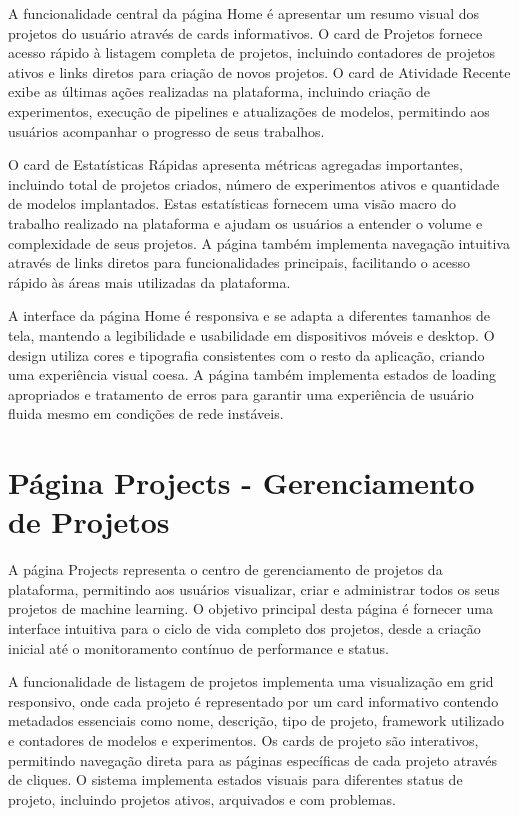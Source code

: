 \documentclass[12pt,a4paper]{article}
\begin{document}
A funcionalidade central da página Home é apresentar um resumo visual dos projetos do usuário através de cards informativos. O card de Projetos fornece acesso rápido à listagem completa de projetos, incluindo contadores de projetos ativos e links diretos para criação de novos projetos. O card de Atividade Recente exibe as últimas ações realizadas na plataforma, incluindo criação de experimentos, execução de pipelines e atualizações de modelos, permitindo aos usuários acompanhar o progresso de seus trabalhos.

O card de Estatísticas Rápidas apresenta métricas agregadas importantes, incluindo total de projetos criados, número de experimentos ativos e quantidade de modelos implantados. Estas estatísticas fornecem uma visão macro do trabalho realizado na plataforma e ajudam os usuários a entender o volume e complexidade de seus projetos. A página também implementa navegação intuitiva através de links diretos para funcionalidades principais, facilitando o acesso rápido às áreas mais utilizadas da plataforma.

A interface da página Home é responsiva e se adapta a diferentes tamanhos de tela, mantendo a legibilidade e usabilidade em dispositivos móveis e desktop. O design utiliza cores e tipografia consistentes com o resto da aplicação, criando uma experiência visual coesa. A página também implementa estados de loading apropriados e tratamento de erros para garantir uma experiência de usuário fluida mesmo em condições de rede instáveis.

\section{Página Projects - Gerenciamento de Projetos}

A página Projects representa o centro de gerenciamento de projetos da plataforma, permitindo aos usuários visualizar, criar e administrar todos os seus projetos de machine learning. O objetivo principal desta página é fornecer uma interface intuitiva para o ciclo de vida completo dos projetos, desde a criação inicial até o monitoramento contínuo de performance e status.

A funcionalidade de listagem de projetos implementa uma visualização em grid responsivo, onde cada projeto é representado por um card informativo contendo metadados essenciais como nome, descrição, tipo de projeto, framework utilizado e contadores de modelos e experimentos. Os cards de projeto são interativos, permitindo navegação direta para as páginas específicas de cada projeto através de cliques. O sistema implementa estados visuais para diferentes status de projeto, incluindo projetos ativos, arquivados e com problemas.
\end{document}
